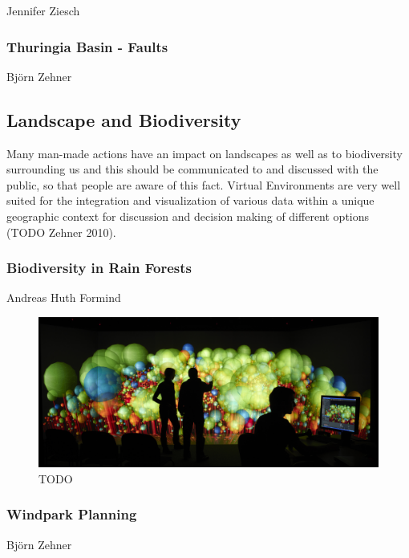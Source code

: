 Jennifer Ziesch

\subsubsection{Thuringia Basin - Faults}
\label{thuringia-basin---faults}

Bj\"orn Zehner

\subsection{Landscape and Biodiversity}
\label{landscape-and-biodiversity}

Many man-made actions have an impact on landscapes as well as to
biodiversity surrounding us and this should be communicated to and
discussed with the public, so that people are aware of this fact.
Virtual Environments are very well suited for the integration and
visualization of various data within a unique geographic context for
discussion and decision making of different options (TODO Zehner 2010).

\subsubsection{Biodiversity in Rain Forests}
\label{biodiversity-in-rain-forests}

Andreas Huth Formind \cite{kohler:98}

\begin{figure}
  \includegraphics[width=\linewidth]{images/biodiversity.jpg}
\caption{TODO}
\label{fig:biodiversity}
\end{figure}

\subsubsection{Windpark Planning}
\label{windpark-planning}

Björn Zehner

